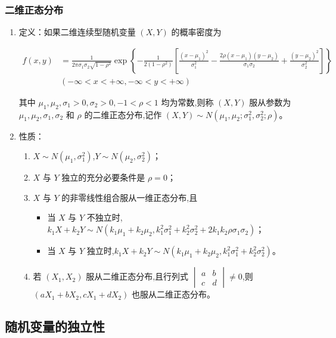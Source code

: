 \documentclass[UTF8]{ctexart}
\theoremstyle{remark}
\begin{document}
		\subsubsection{二维正态分布}
		\begin{enumerate}
			\item 定义：如果二维连续型随机变量 \((X, Y)\) 的概率密度为
			
			\begin{align*}
				f(x, y) &= \frac{1}{2\pi\sigma_1\sigma_2\sqrt{1 - \rho^2}} \exp\left\{-\frac{1}{2(1 - \rho^2)}\left[\frac{(x - \mu_1)^2}{\sigma_1^2} - \frac{2\rho(x - \mu_1)(y - \mu_2)}{\sigma_1\sigma_2} + \frac{(y - \mu_2)^2}{\sigma_2^2}\right]\right\}\\
				&(-\infty < x < +\infty, -\infty < y < +\infty)
			\end{align*}
			
			其中 \(\mu_1, \mu_2, \sigma_1 > 0, \sigma_2 > 0, -1 < \rho < 1\) 均为常数,则称 \((X, Y)\) 服从参数为 \(\mu_1, \mu_2, \sigma_1, \sigma_2\) 和 \(\rho\) 的二维正态分布,记作 \((X, Y) \sim N(\mu_1, \mu_2; \sigma_1^2, \sigma_2^2; \rho)\)。
			
			\setcounter{enumi}{1}
			\item 性质：
			\begin{enumerate}
				\item \(X \sim N(\mu_1, \sigma_1^2)\),\(Y \sim N(\mu_2, \sigma_2^2)\)；
				\item \(X\) 与 \(Y\) 独立的充分必要条件是 \(\rho = 0\)；
				\item \(X\) 与 \(Y\) 的非零线性组合服从一维正态分布,且
				\begin{itemize}
					\item 当 \(X\) 与 \(Y\) 不独立时,\(k_1X + k_2Y \sim N(k_1\mu_1 + k_2\mu_2, k_1^2\sigma_1^2 + k_2^2\sigma_2^2 + 2k_1k_2\rho\sigma_1\sigma_2)\)；
					\item 当 \(X\) 与 \(Y\) 独立时,\(k_1X + k_2Y \sim N(k_1\mu_1 + k_2\mu_2, k_1^2\sigma_1^2 + k_2^2\sigma_2^2)\)。
				\end{itemize}
				\item 若 \((X_1, X_2)\) 服从二维正态分布,且行列式 \(\begin{vmatrix}a & b\\c & d\end{vmatrix} \neq 0\),则 \((aX_1 + bX_2, cX_1 + dX_2)\) 也服从二维正态分布。
			\end{enumerate}
		\end{enumerate}
		
		\subsection{随机变量的独立性}
\end{document}
